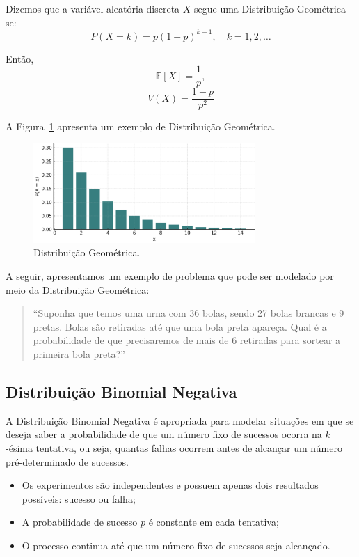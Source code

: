 \documentclass{article}
\begin{document}
Dizemos que a variável aleatória discreta $X$ segue uma Distribuição Geométrica se:
    $$
    P(X = k) = p(1 - p)^{k - 1}, \quad k = 1, 2, \ldots
    $$

Então,
    $$
    \mathbb{E}[X] = \frac{1}{p},
    $$
    $$
    V(X) = \frac{1 - p}{p^2}
    $$

A Figura~\ref{fig:dist_disc_geometrica} apresenta um exemplo de Distribuição Geométrica.

\begin{figure}[H]
    \centering
    \includegraphics[width=0.75\textwidth]{figuras/dist_disc_geometrica.png}
    \caption{Distribuição Geométrica.}
    \label{fig:dist_disc_geometrica}
\end{figure}

A seguir, apresentamos um exemplo de problema que pode ser modelado por meio da Distribuição Geométrica:
\begin{quote}
``Suponha que temos uma urna com 36 bolas, sendo 27 bolas brancas e 9 pretas. Bolas são retiradas até que uma bola preta apareça. Qual é a probabilidade de que precisaremos de mais de 6 retiradas para sortear a primeira bola preta?''
\end{quote}

\subsection{Distribuição Binomial Negativa}
A Distribuição Binomial Negativa é apropriada para modelar situações em que se deseja saber a probabilidade de que um número fixo de sucessos ocorra na $k$-ésima tentativa, ou seja, quantas falhas ocorrem antes de alcançar um número pré-determinado de sucessos.
\begin{itemize}
    \item Os experimentos são independentes e possuem apenas dois resultados possíveis: sucesso ou falha;
    \item A probabilidade de sucesso $p$ é constante em cada tentativa;
    \item O processo continua até que um número fixo de sucessos seja alcançado.
\end{itemize}
\end{document}
